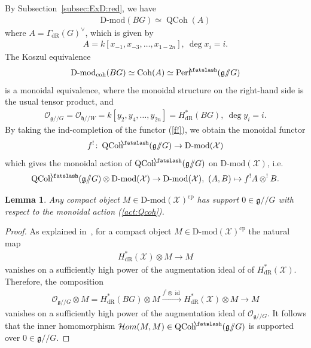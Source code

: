 \documentclass [11pt,oneside,a4paper,mathscr]{amsart}
\newtheorem{lemma}[thm]{Lemma}
\theoremstyle{definition}
\newcommand{\QCoh}{\operatorname{QCoh}}
\newcommand{\X}{\mathcal{X}}
\newcommand{\Coh}{\operatorname{Coh}}
\newcommand{\id}{\operatorname{id}}
\newcommand{\shear}{{\mathbin{\mkern-6mu\fatslash}}}
\newcommand{\ssslash}{/\!\!/}
\begin{document}
By Subsection~\ref{subsec:ExD:red}, we have
\begin{align*}
    \text{D-mod}(BG) \simeq \QCoh(A)
\end{align*}
where $A=\Gamma_{\mathrm{dR}}(G)^{\vee}$, which is given by 
\begin{align*}
A=k[x_{-1}, x_{-3}, \ldots, x_{1-2n}], \ \deg x_i=i. 
\end{align*}
The Koszul equivalence
\begin{align*}
    \text{D-mod}_{\mathrm{coh}}(BG) \simeq \Coh(A)
    \simeq \mathrm{Perf}^{\shear}(\mathfrak{g}\ssslash G)
\end{align*}
is a monoidal equivalence, where 
the monoidal structure on the right-hand side is the usual tensor product, and 
\begin{align*}
    \mathcal{O}_{\mathfrak{g}\ssslash G}=\mathcal{O}_{\mathfrak{h}\ssslash W}=k[y_2, y_4, \ldots, y_{2n}]=H^{*}_{\mathrm{dR}}(BG), \ \deg y_i=i. 
\end{align*}
By taking the ind-completion of the functor (\ref{f!}), we obtain 
the monoidal functor 
\begin{align*}
f^! \colon
    \QCoh^{\shear}(\mathfrak{g}\ssslash G) \to \text{D-mod}(\mathcal{X})
\end{align*}
which gives the monoidal action of $\QCoh^{\shear}(\mathfrak{g}\ssslash G)$
on $\text{D-mod}(\mathcal{X})$, i.e. 
\begin{align}\label{act:Qcoh}
   \QCoh^{\shear}(\mathfrak{g}\ssslash G) \otimes 
 \text{D-mod}(\mathcal{X}) \to   \text{D-mod}(\mathcal{X}), \ 
 (A, B)\mapsto f^! A\otimes^! B. 
\end{align}
\begin{lemma}\label{lem:supp:dmod}
Any compact object $M\in \mathrm{D}\text{-}\mathrm{mod}(\mathcal{X})^{\mathrm{cp}}$ has 
support $0\in \mathfrak{g}\ssslash G$ with respect to the monoidal action (\ref{act:Qcoh}). 
\end{lemma}
\begin{proof}
As explained in~\cite[Remark~12.8.8]{AG}, for a compact object 
$M\in \text{D-mod}(\X)^{\mathrm{cp}}$ the natural map 
\begin{align*}
    H_{\mathrm{dR}}^{*}(\X)\otimes M \to M
\end{align*}
vanishes on a sufficiently high power of the augmentation ideal of 
of $H_{\mathrm{dR}}^{*}(\X)$. Therefore, the composition 
\begin{align*}
    \mathcal{O}_{\mathfrak{g}\ssslash G}\otimes M=H_{\mathrm{dR}}^{*}(BG) \otimes M
    \stackrel{f^! \otimes \id}{\to} H_{\mathrm{dR}}^{*}(\X)\otimes M \to M
\end{align*}
vanishes on a sufficiently high power of the augmentation ideal of 
$\mathcal{O}_{\mathfrak{g}\ssslash G}$. It follows that the inner homomorphism 
$\mathcal{H}om(M, M) \in \QCoh^{\shear}(\mathfrak{g}\ssslash G)$
is supported over $0 \in \mathfrak{g}\ssslash G$. 
\end{proof}
\end{document}
